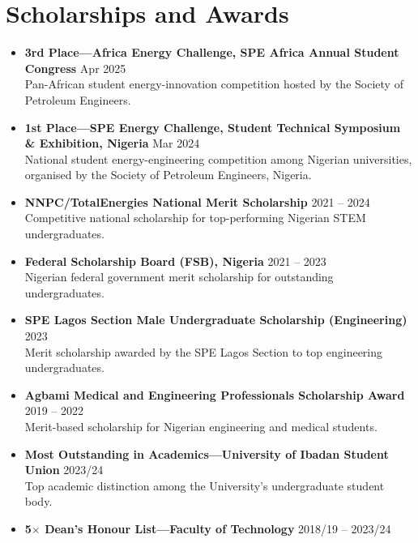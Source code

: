 \documentclass[10pt, a4paper]{article}
\begin{document}
\section{Scholarships and Awards}

\begin{itemize}
  \item \textbf{3rd Place---Africa Energy Challenge, SPE Africa Annual Student Congress} \hfill Apr 2025\\
        {\footnotesize Pan-African student energy-innovation competition hosted by the Society of Petroleum Engineers.}
  \item \textbf{1st Place---SPE Energy Challenge, Student Technical Symposium \& Exhibition, Nigeria} \hfill Mar 2024\\
        \footnotesize National student energy-engineering competition among Nigerian universities, organised by the Society of Petroleum Engineers, Nigeria.
  \item \textbf{NNPC/TotalEnergies National Merit Scholarship} \hfill 2021 -- 2024\\
        \footnotesize Competitive national scholarship for top-performing Nigerian STEM undergraduates.
  \item \textbf{Federal Scholarship Board (FSB), Nigeria} \hfill 2021 -- 2023\\
        \footnotesize Nigerian federal government merit scholarship for outstanding undergraduates.
  \item \textbf{SPE Lagos Section Male Undergraduate Scholarship (Engineering)} \hfill 2023\\
        \footnotesize Merit scholarship awarded by the SPE Lagos Section to top engineering undergraduates.
  \item \textbf{Agbami Medical and Engineering Professionals Scholarship Award} \hfill 2019 -- 2022\\
        \footnotesize Merit-based scholarship for Nigerian engineering and medical students.
  \item \textbf{Most Outstanding in Academics---University of Ibadan Student Union} \hfill 2023/24\\
        \footnotesize Top academic distinction among the University's undergraduate student body.
  \item \textbf{5$\times$ Dean's Honour List---Faculty of Technology} \hfill 2018/19 -- 2023/24\\

\end{itemize}
\end{document}
